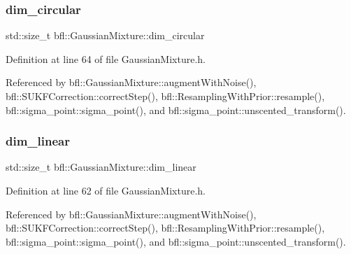 \mbox{\label{classbfl_1_1GaussianMixture_a23f3b92753266475a9bff8ee7e1c9518}} 
\subsubsection{\texorpdfstring{dim\+\_\+circular}{dim\_circular}}
{\footnotesize\ttfamily std\+::size\+\_\+t bfl\+::\+Gaussian\+Mixture\+::dim\+\_\+circular\hspace{0.3cm}{\ttfamily [inherited]}}



Definition at line 64 of file Gaussian\+Mixture.\+h.



Referenced by bfl\+::\+Gaussian\+Mixture\+::augment\+With\+Noise(), bfl\+::\+S\+U\+K\+F\+Correction\+::correct\+Step(), bfl\+::\+Resampling\+With\+Prior\+::resample(), bfl\+::sigma\+\_\+point\+::sigma\+\_\+point(), and bfl\+::sigma\+\_\+point\+::unscented\+\_\+transform().

\mbox{\label{classbfl_1_1GaussianMixture_a22a0fbc77f90d9d75e89d7898484c05a}} 
\subsubsection{\texorpdfstring{dim\+\_\+linear}{dim\_linear}}
{\footnotesize\ttfamily std\+::size\+\_\+t bfl\+::\+Gaussian\+Mixture\+::dim\+\_\+linear\hspace{0.3cm}{\ttfamily [inherited]}}



Definition at line 62 of file Gaussian\+Mixture.\+h.



Referenced by bfl\+::\+Gaussian\+Mixture\+::augment\+With\+Noise(), bfl\+::\+S\+U\+K\+F\+Correction\+::correct\+Step(), bfl\+::\+Resampling\+With\+Prior\+::resample(), bfl\+::sigma\+\_\+point\+::sigma\+\_\+point(), and bfl\+::sigma\+\_\+point\+::unscented\+\_\+transform().

\mbox{\label{classbfl_1_1GaussianMixture_adaa8d9c6d03be835769cc848aba81067}} 
